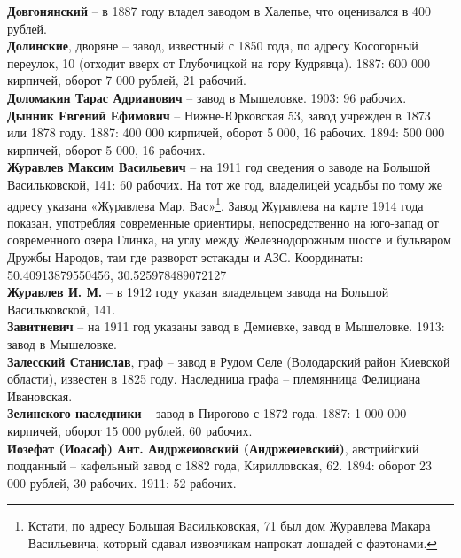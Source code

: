 \noindent\textbf{Довгонянский} – в 1887 году владел заводом в Халепье, что оценивался в 400 рублей.\\

\noindent\textbf{Долинские}, дворяне – завод, известный с 1850 года, по адресу Косогорный переулок, 10 (отходит вверх от Глубочицкой на гору Кудрявца). 1887: 600 000 кирпичей, оборот 7 000 рублей, 21 рабочий.\\

\noindent\textbf{Доломакин Тарас Адрианович} – завод в Мышеловке. 1903: 96 рабочих.\\

\noindent\textbf{Дынник Евгений Ефимович} – Нижне-Юрковская 53, завод учрежден в 1873 или 1878 году. 1887: 400 000 кирпичей, оборот 5 000, 16 рабочих. 1894: 500 000 кирпичей, оборот 5 000, 16 рабочих.\\

\noindent\textbf{Журавлев Максим Васильевич} – на 1911 год сведения о заводе на Большой Васильковской, 141: 60 рабочих. На тот же год, владелицей усадьбы по тому же адресу указана «Журавлева Мар. Вас»\footnote{Кстати, по адресу Большая Васильковская, 71 был дом Журавлева Макара Васильевича, который сдавал извозчикам напрокат лошадей с фаэтонами.}. Завод Журавлева на карте 1914 года показан, употребляя современные ориентиры, непосредственно на юго-запад от современного озера Глинка, на углу между Железнодорожным шоссе и бульваром Дружбы Народов, там где разворот эстакады и АЗС. Координаты: 50.40913879550456, 30.525978489072127\\

\noindent\textbf{Журавлев И. М.} – в 1912 году указан владельцем завода на Большой Васильковской, 141.\\

\noindent\textbf{Завитневич} – на 1911 год указаны завод в Демиевке, завод в Мышеловке. 1913: завод в Мышеловке.\\

\noindent\textbf{Залесский Станислав}, граф – завод в Рудом Селе (Володарский район Киевской области), известен в 1825 году. Наследница графа – племянница Фелициана Ивановская.\\

\noindent\textbf{Зелинского наследники} – завод в Пирогово с 1872 года. 1887: 1 000 000 кирпичей, оборот 15 000 рублей, 60 рабочих.\\

\noindent\textbf{Иозефат (Иоасаф) Ант. Андржеиовский (Андржеиевский)}, австрийский подданный – кафельный завод с 1882 года, Кирилловская, 62. 1894: оборот 23 000 рублей, 30 рабочих. 1911: 52 рабочих.\\

